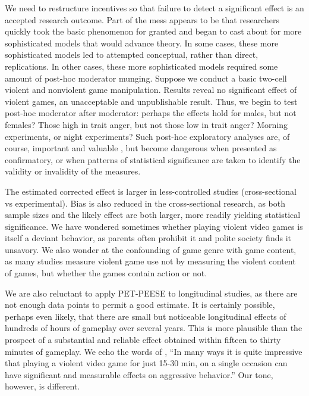 \documentclass[man]{apa6}
\begin{document}
We need to restructure incentives so that failure to detect a significant effect is an accepted research outcome. %
Part of the mess appears to be that researchers quickly took the basic phenomenon for granted and began to cast about for more sophisticated models that would advance theory. In some cases, these more sophisticated models led to attempted conceptual, rather than direct, replications. In other cases, these more sophisticated models required some amount of post-hoc moderator munging. Suppose we conduct a basic two-cell violent and nonviolent game manipulation. Results reveal no significant effect of violent games, an unacceptable and unpublishable result. Thus, we begin to test post-hoc moderator after moderator: perhaps the effects hold for males, but not females? Those high in trait anger, but not those low in trait anger? Morning experiments, or night experiments? Such post-hoc exploratory analyses are, of course, important and valuable \citep[indeed, we present them ourselves in][]{Engelhardt:etal:2014}, but become dangerous when presented as confirmatory, or when patterns of statistical significance are taken to identify the validity or invalidity of the measures.

The estimated corrected effect is larger in less-controlled studies (cross-sectional vs experimental). Bias is also reduced in the cross-sectional research, as both sample sizes and the likely effect are both larger, more readily yielding statistical significance. 
We have wondered sometimes whether playing violent video games is itself a deviant behavior, as parents often prohibit it and polite society finds it unsavory. We also wonder at the confounding of game genre with game content, as many studies %
measure violent game use not by measuring the violent content of games, but whether the games contain action or not.

We are also reluctant to apply PET-PEESE to longitudinal studies, as there are not enough data points to permit a good estimate. It is certainly possible, perhaps even likely, that there are small but noticeable longitudinal effects of hundreds of hours of gameplay over several years. This is more plausible than the prospect of a substantial and reliable effect obtained within fifteen to thirty minutes of gameplay. We echo the words of \citet[p. 51]{Bushman:Huesmann:2014}, ``In many ways it is quite impressive that playing a violent video game for just 15-30 min, on a single occasion can have significant and measurable effects on aggressive behavior.'' Our tone, however, is different.
\end{document}
